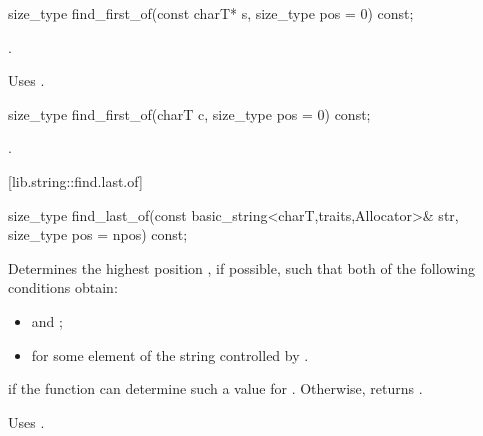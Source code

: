 %
%
\begin{itemdecl}
size_type find_first_of(const charT* s, size_type pos = 0) const;
\end{itemdecl}

\begin{itemdescr}
\pnum
\returns
{}.

\pnum
\notes
Uses .
\end{itemdescr}

%
%
\begin{itemdecl}
size_type find_first_of(charT c, size_type pos = 0) const;
\end{itemdecl}

\begin{itemdescr}
\pnum
\returns
{}.
\end{itemdescr}

[lib.string::find.last.of]{}

%
%
\begin{itemdecl}
size_type
  find_last_of(const basic_string<charT,traits,Allocator>& str,
               size_type pos = npos) const;
\end{itemdecl}

\begin{itemdescr}
\pnum
\effects
Determines the highest position , if possible, such that both of
the following conditions obtain:

\begin{itemize}
\item
{}
and
;
\item
{}%
for some element  of the string controlled by .
\end{itemize}

\pnum
\returns
{} if the function can determine such a value for .
Otherwise, returns
.

\pnum
\notes
Uses
.
\end{itemdescr}

